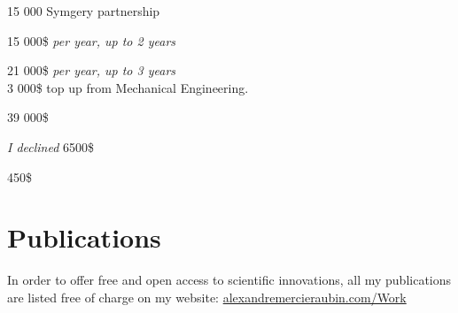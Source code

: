 \documentclass[10pt]{article} %
\begin{document}
{
 15 000 Symgery partnership \\
}

{
 15 000\$ \textit{per year, up to 2 years} \\
}

{
 21 000\$ \textit{per year, up to 3 years} \\
 3 000\$ top up from Mechanical Engineering.\\
}

{
\textit{} 39 000\$\\
}

{
\textit{I declined} 6500\$\\
}

{
\textit{} 450\$\\
}

\section{Publications}
In order to offer free and open access to scientific innovations, all my publications are listed free of charge on my website: \href{https://alexandremercieraubin.com/Work}{alexandremercieraubin.com/Work}

\end{document}
